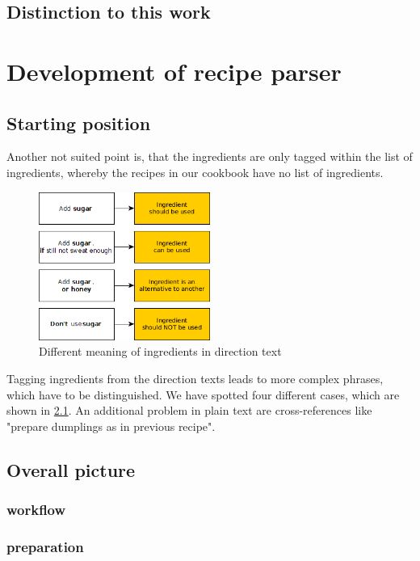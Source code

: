 \documentclass[12pt, twoside]{report}
\begin{document}
\section{Distinction to this work}



\chapter{Development of recipe parser}

\section{Starting position}
Another not suited point is, that the ingredients are only tagged within the list of ingredients, whereby the recipes in our cookbook have no list of ingredients.

\begin{figure}
	\includegraphics[width=0.5\textwidth]{Images/ingredientsInText}
	\caption{Different meaning of ingredients in direction text}
	\label{fig:ingredientsInText}
\end{figure}

Tagging ingredients from the direction texts leads to more complex phrases, which have to be distinguished. We have spotted four different cases, which are shown in \cref{fig:ingredientsInText}. An additional problem in plain text are cross-references like "prepare dumplings as in previous recipe".

\section{Overall picture}
\subsection{workflow}
\subsection{preparation}
\end{document}
